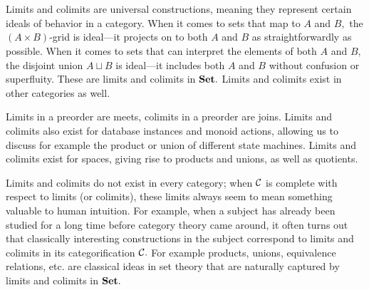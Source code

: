 \documentclass[CT4S-EN-RU]{subfiles}
\begin{document}
\section{}

\begin{blockENG}
Limits and colimits are universal constructions, meaning they represent certain ideals of behavior in a category. When it comes to sets that map to $A$ and $B,$ the $(A\times B)$-grid is ideal—it projects on to both $A$ and $B$ as straightforwardly as possible. When it comes to sets that can interpret the elements of both $A$ and $B,$ the disjoint union $A\sqcup B$ is ideal—it includes both $A$ and $B$ without confusion or superfluity. These are limits and colimits in ${\mathbf{Set}}.$ Limits and colimits exist in other categories as well.
\end{blockENG}

\begin{blockRUS}
\end{blockRUS}

\begin{blockENG}
Limits in a preorder are meets, colimits in a preorder are joins. Limits and colimits also exist for database instances and monoid actions, allowing us to discuss for example the product or union of different state machines. Limits and colimits exist for spaces, giving rise to products and unions, as well as quotients.
\end{blockENG}

\begin{blockRUS}
\end{blockRUS}

\begin{blockENG}
Limits and colimits do not exist in every category; when $\mathcal{C}$ is complete with respect to limits (or colimits), these limits always seem to mean something valuable to human intuition. For example, when a subject has already been studied for a long time before category theory came around, it often turns out that classically interesting constructions in the subject correspond to limits and colimits in its categorification $\mathcal{C}.$ For example products, unions, equivalence relations, etc. are classical ideas in set theory that are naturally captured by limits and colimits in ${\mathbf{Set}}.$ 
\end{blockENG}

\begin{blockRUS}
\end{blockRUS}
\end{document}

